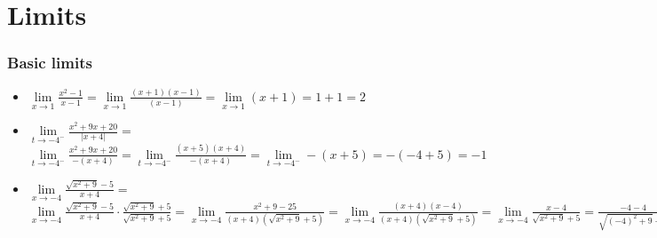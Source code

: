 \iffalse

MIT License

Copyright (c) 2023 Aron Hardeman

Permission is hereby granted, free of charge, to any person obtaining a copy
of this software and associated documentation files (the "Software"), to deal
in the Software without restriction, including without limitation the rights
to use, copy, modify, merge, publish, distribute, sublicense, and/or sell
copies of the Software, and to permit persons to whom the Software is
furnished to do so, subject to the following conditions:

The above copyright notice and this permission notice shall be included in all
copies or substantial portions of the Software.

THE SOFTWARE IS PROVIDED "AS IS", WITHOUT WARRANTY OF ANY KIND, EXPRESS OR
IMPLIED, INCLUDING BUT NOT LIMITED TO THE WARRANTIES OF MERCHANTABILITY,
FITNESS FOR A PARTICULAR PURPOSE AND NONINFRINGEMENT. IN NO EVENT SHALL THE
AUTHORS OR COPYRIGHT HOLDERS BE LIABLE FOR ANY CLAIM, DAMAGES OR OTHER
LIABILITY, WHETHER IN AN ACTION OF CONTRACT, TORT OR OTHERWISE, ARISING FROM,
OUT OF OR IN CONNECTION WITH THE SOFTWARE OR THE USE OR OTHER DEALINGS IN THE
SOFTWARE.

\fi\section{Limits}

\begin{frame}

\frametitle{Basic limits}

\begin{itemize}
\item  $\lim\limits_{x\to1}\frac{x^2-1}{x-1}=$\pause$\lim\limits_{x\to1}\frac{(x+1)(x-1)}{(x-1)}=\lim\limits_{x\to1}(x+1)=1+1=2$
\item\pause $\lim\limits_{t\to-4^-}\frac{x^2+9x+20}{\left|x+4\right|}=$\pause$\lim\limits_{t\to-4^-}\frac{x^2+9x+20}{-(x+4)}=\lim\limits_{t\to-4^-}\frac{(x+5)(x+4)}{-(x+4)}=\lim\limits_{t\to-4^-}-(x+5)=-(-4+5)=-1$
\item\pause $\lim\limits_{x\to-4}\frac{\sqrt{x^2+9}-5}{x+4}=$\pause$\lim\limits_{x\to-4}\frac{\sqrt{x^2+9}-5}{x+4}\cdot\frac{\sqrt{x^2+9}+5}{\sqrt{x^2+9}+5}=\lim\limits_{x\to-4}\frac{x^2+9-25}{(x+4)(\sqrt{x^2+9}+5)}=\lim\limits_{x\to-4}\frac{(x+4)(x-4)}{(x+4)(\sqrt{x^2+9}+5)}=\lim\limits_{x\to-4}\frac{x-4}{\sqrt{x^2+9}+5}=\frac{-4-4}{\sqrt{(-4)^2+9}+5}=-\frac{4}{5}$
\end{itemize}


\end{frame}

